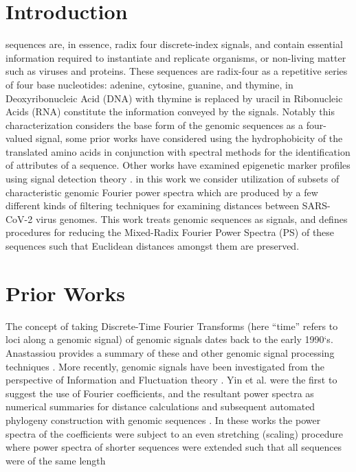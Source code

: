 \documentclass[12pt,conference]{IEEEtran}
\begin{document}
\maketitle

\IEEEdisplaynontitleabstractindextext

\IEEEpeerreviewmaketitle

\vspace{- 1 em}
\section{Introduction}
\label{sec:int}

 sequences are, in essence, radix four discrete-index signals, 
and contain essential information required to instantiate and replicate organisms, or non-living matter 
such as viruses and proteins.
These sequences are radix-four as a repetitive series of four base nucleotides: adenine, cytosine, guanine, 
and thymine, in Deoxyribonucleic Acid (DNA) with thymine is replaced by uracil in Ribonucleic Acids 
(RNA) constitute the information conveyed by the signals. 
Notably this characterization considers the base form of the genomic sequences as a four-valued signal, 
some prior works have considered using the hydrophobicity of the translated amino acids in conjunction 
with spectral methods for the identification of attributes of a sequence. \cite{Shu17} 
Other works have examined epigenetic marker profiles using signal detection theory \cite{San19}.
in this work we consider utilization of subsets of characteristic genomic Fourier power spectra which are
produced by a few different kinds of filtering techniques for examining distances between SARS-CoV-2 virus genomes. 
This work treats genomic sequences as signals, and defines procedures for reducing the Mixed-Radix \cite{Sin69} Fourier Power Spectra (PS) of these sequences such that Euclidean distances amongst them are preserved. 
\vspace{-0.5 em}
\section{Prior Works}
\label{sec:pw}
The concept of taking Discrete-Time Fourier Transforms (here ``time'' refers to loci along a genomic signal) 
of genomic signals dates back to the early 1990`s.  Anastassiou provides a summary of these and other
genomic signal processing techniques \cite{Ana01}.
More recently, genomic signals have been investigated from the perspective of 
Information and Fluctuation theory \cite{Dem14}.  
Yin et al. were the first to suggest the use of Fourier coefficients, and the resultant power spectra as 
numerical summaries for distance calculations and subsequent automated phylogeny construction with 
genomic sequences \cite{yin20, yin14, yin15,pei19,Hoa15}.
In these works the power spectra of the coefficients were subject to an even stretching (scaling) procedure 
where power spectra of shorter sequences were extended such that all sequences were of the same length
\vspace{-0.5 em} 
\end{document}
